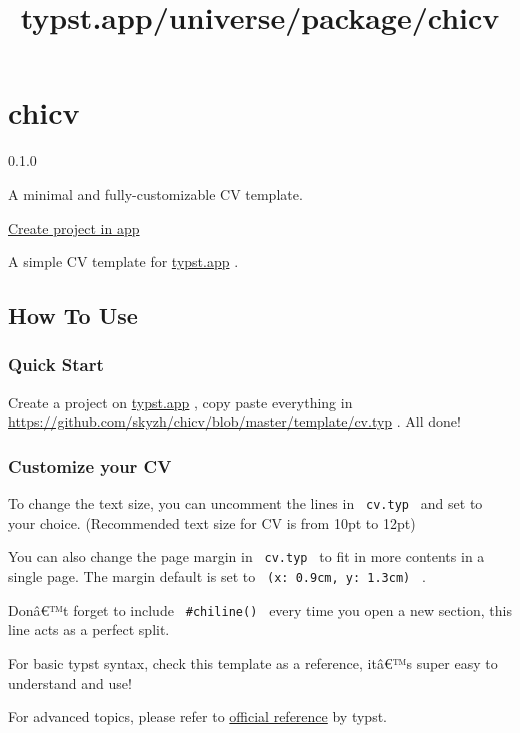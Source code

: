 \title{typst.app/universe/package/chicv}

\label{banner}
\label{template-thumbnail}

\section{chicv}\label{chicv}

{ 0.1.0 }

A minimal and fully-customizable CV template.

\href{/app?template=chicv&version=0.1.0}{Create project in app}

\label{readme}
A simple CV template for \href{https://typst.app/}{typst.app} .

\subsection{How To Use}\label{how-to-use}

\subsubsection{Quick Start}\label{quick-start}

Create a project on \href{https://typst.app/}{typst.app} , copy paste
everything in
\url{https://github.com/skyzh/chicv/blob/master/template/cv.typ} . All
done!

\subsubsection{Customize your CV}\label{customize-your-cv}

To change the text size, you can uncomment the lines in
\texttt{\ cv.typ\ } and set to your choice. (Recommended text size for
CV is from 10pt to 12pt)

You can also change the page margin in \texttt{\ cv.typ\ } to fit in
more contents in a single page. The margin default is set to
\texttt{\ (x:\ 0.9cm,\ y:\ 1.3cm)\ } .

Donâ€™t forget to include \texttt{\ \#chiline()\ } every time you open a
new section, this line acts as a perfect split.

For basic typst syntax, check this template as a reference, itâ€™s super
easy to understand and use!

For advanced topics, please refer to
\href{https://typst.app/docs/reference/}{official reference} by typst.

